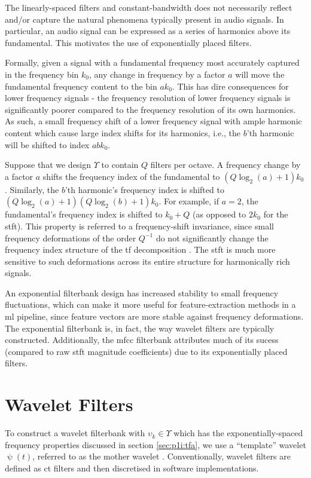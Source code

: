 The linearly-spaced filters and constant-bandwidth does not necessarily reflect and/or capture the natural phenomena typically present in audio signals. In particular, an audio signal can be expressed as a series of harmonics above its fundamental. This motivates the use of exponentially placed filters.

Formally, given a signal with a fundamental frequency most accurately captured in the frequency bin $k_0$, any change in frequency by a factor $a$ will move the fundamental frequency content to the bin $a k_0$. This has dire consequences for lower frequency signals - the frequency resolution of lower frequency signals is significantly poorer compared to the frequency resolution of its own harmonics. As such, a small frequency shift of a lower frequency signal with ample harmonic content which cause large index shifts for its harmonics, i.e., the $b$'th harmonic will be shifted to index $a b k_0$.

Suppose that we design $\Upsilon$ to contain $Q$ filters per octave. A frequency change by a factor $a$ shifts the frequency index of the fundamental to $(Q\log_2 (a) + 1) k_0$. Similarly, the $b$'th harmonic's frequency index is shifted to $(Q\log_2 (a) + 1) (Q\log_2 (b) + 1) k_0$. For example, if $a=2$, the fundamental's frequency index is shifted to $k_0 + Q$ (as opposed to $2 k_0$ for the \ac{stft}). This property is referred to a frequency-shift invariance, since small frequency deformations of the order $Q^{-1}$ do not significantly change the frequency index structure of the \ac{tf} decomposition \citep{1dscattering1}. The \ac{stft} is much more sensitive to such deformations across its entire structure for harmonically rich signals.

An exponential filterbank design has increased stability to small frequency fluctuations, which can make it more useful for feature-extraction methods in a \ac{ml} pipeline, since feature vectors are more stable against frequency deformations. The exponential filterbank is, in fact, the way wavelet filters are typically constructed. Additionally, the \ac{mfcc} filterbank attributes much of its sucess (compared to raw \ac{stft} magnitude coefficients) due to its exponentially placed filters.

\section{Wavelet Filters}
\label{sec:p1i:wavelets}

To construct a wavelet filterbank with $\upsilon_k \in \Upsilon$ which has the exponentially-spaced frequency properties discussed in section \ref{sec:p1i:tfa}, we use a ``template'' wavelet $\uppsi(t)$, referred to as the mother wavelet \cite{waveletbook}. Conventionally, wavelet filters are defined as \ac{ct} filters and then discretised in software implementations. 

